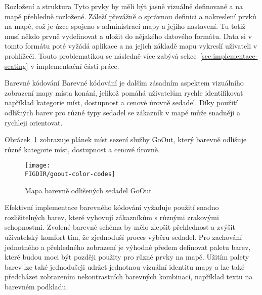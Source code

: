 \begin{subsection}{Rozložení a struktura}
    Tyto prvky by měli být jasně vizuálně definované a na mapě přehledně rozložené.
    Záleží převážně o správnou definici a nakreslení prvků na mapě, což je úzce spojeno s administrací mapy a jejího nastavení.
    Tu totiž musí někdo prvně vydefinovat a uložit do nějakého datového formátu.
    Data si v tomto formátu poté vyžádá aplikace a na jejich základě mapu vykreslí uživateli v prohlížeči.
    Touto problematikou se následně více zabývá sekce~\ref{sec:implementace-seating} v implementační části práce.
\end{subsection}

\begin{subsection}{Barevné kódování}
    \label{subsec:identifikace-interaktivni-mapa-barevne-kody}
    Barevné kódování je dalším zásadním aspektem vizuálního zobrazení mapy místa konání, jelikož pomáhá uživatelům rychle identifikovat například kategorie míst, dostupnost a cenové úrovně sedadel.
    Díky použití odlišných barev pro různé typy sedadel se zákazník v mapě může snadněji a rychleji orientovat.

    Obrázek~\ref{fig:goout-color-codes} zobrazuje plánek míst sezení služby GoOut, který barevně odlišuje různé kategorie míst, dostupnost a cenové úrovně.

    \begin{figure}[H]
        \texttt{[image: \\FIGDIR/goout-color-codes]}
        \centering
        \caption{Mapa barevně odlišených sedadel GoOut\cite{g__goout_net}}
        \label{fig:goout-color-codes}
    \end{figure}

    Efektivní implementace barevného kódování vyžaduje použití snadno rozlišitelných barev, které vyhovují zákazníkům s různými zrakovými schopnostmi.
    Zvolené barevné schéma by mělo zlepšit přehlednost a zvýšit uživatelský komfort tím, že zjednoduší proces výběru sedadel.
    Pro zachování jednotného a přehledného zobrazení je výhodné předem definovat paletu barev, které budou moci být později použity pro různé prvky na mapě.
    Užitím palety barev lze také jednodušeji udržet jednotnou vizuální identitu mapy a lze také předcházet zobrazením nekontrastních barevných kombinací, například textu na barevném podkladu.
\end{subsection}

